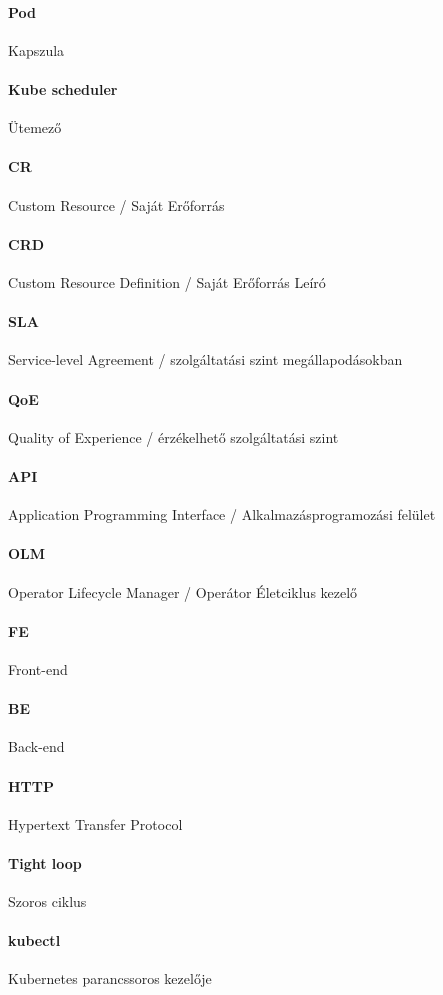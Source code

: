 \paragraph{Pod} Kapszula
\paragraph{Kube scheduler} Ütemező
\paragraph{CR} Custom Resource / Saját Erőforrás
\paragraph{CRD} Custom Resource Definition / Saját Erőforrás Leíró
\paragraph{SLA} Service-level Agreement / szolgáltatási szint megállapodásokban
\paragraph{QoE} Quality of Experience / érzékelhető szolgáltatási szint
\paragraph{API} Application Programming Interface / Alkalmazásprogramozási felület
\paragraph{OLM} Operator Lifecycle Manager / Operátor Életciklus kezelő
\paragraph{FE} Front-end
\paragraph{BE} Back-end
\paragraph{HTTP} Hypertext Transfer Protocol
\paragraph{Tight loop} Szoros ciklus
\paragraph{kubectl} Kubernetes parancssoros kezelője
